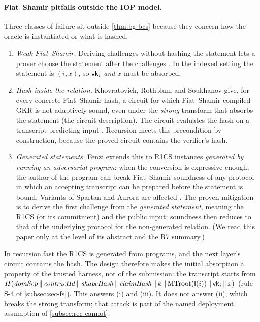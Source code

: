 \paragraph{Fiat--Shamir pitfalls outside the IOP model.} Three classes of failure sit outside
\cref{thm:bg-bcs} because they concern how the oracle is instantiated or what is hashed.
\begin{enumerate}[nosep,label=(\roman*)]
\item \emph{Weak Fiat--Shamir.} Deriving challenges without hashing the statement lets a prover
  choose the statement after the challenges \cite{BPW12-WeakFS}. In the indexed setting the
  statement is $(i,x)$, so $\mathsf{vk}_i$ \emph{and} $x$ must be absorbed.
\item \emph{Hash inside the relation.} Khovratovich, Rothblum and Soukhanov give, for every
  concrete Fiat--Shamir hash, a circuit for which Fiat--Shamir-compiled GKR is not adaptively
  sound, even under the \emph{strong} transform that absorbs the statement (the circuit
  description). The circuit evaluates the hash on a transcript-predicting input \cite{KRS25}. Recursion
  meets this precondition by construction, because the proved circuit contains the verifier's
  hash.
\item \emph{Generated statements.} Fenzi extends this to R1CS instances \emph{generated by running
  an adversarial program}: when the conversion is expressive enough, the author of the program can
  break Fiat--Shamir soundness of any protocol in which an accepting transcript can be prepared
  before the statement is bound. Variants of Spartan and Aurora \cite{BCRSVW19-Aurora} are
  affected \cite{Fen26-GenR1CS}. The proven mitigation is to derive the first challenge from the
  \emph{generated statement}, meaning the R1CS (or its commitment) and the public input; soundness
  then reduces to that of the underlying protocol for the non-generated relation. (We read this
  paper only at the level of its abstract and the R7 summary.)
\end{enumerate}
In recursion.fast the R1CS is generated from programs, and the next layer's circuit contains the
hash. The design therefore makes the initial absorption a property of the trusted harness, not of
the submission: the transcript starts from
$H(\mathit{domSep}\,\|\,\mathit{contractId}\,\|\,\mathit{shapeHash}\,\|\,\mathit{claimHash}\,\|\,k\,\|\,\mathrm{MTroot}(\mathsf{I}(i))\,\|\,\mathsf{vk}_i\,\|\,x)$
(rule S-4 of \cref{subsec:sec-fs}). This answers (i) and (iii). It does not answer (ii), which
breaks the strong transform; that attack is part of the named deployment assumption of
\cref{subsec:rec-cannot}.

